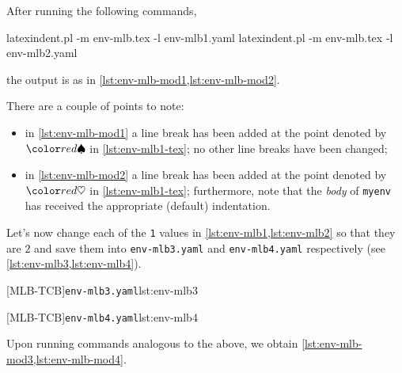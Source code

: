 After running the following commands,
\begin{commandshell}
latexindent.pl -m env-mlb.tex -l env-mlb1.yaml
latexindent.pl -m env-mlb.tex -l env-mlb2.yaml
\end{commandshell}
the output is as in \cref{lst:env-mlb-mod1,lst:env-mlb-mod2}.

\begin{sidebyside}
\begin{minipage}{.57\linewidth}
\end{minipage}
\hfill
\begin{minipage}{.42\linewidth}
\end{minipage}
\end{sidebyside}

There are a couple of points to note:
\begin{itemize}
  \item in \cref{lst:env-mlb-mod1} a line break has been added at the point denoted by $\BeginStartsOnOwnLine$ in \cref{lst:env-mlb1-tex}; no 
    other line breaks have been changed;
  \item in \cref{lst:env-mlb-mod2} a line break has been added at the point denoted by $\BodyStartsOnOwnLine$ in \cref{lst:env-mlb1-tex}; 
    furthermore, note that the \emph{body} of \texttt{myenv} has received the appropriate (default) indentation.
\end{itemize}

Let's now change each of the \texttt{1} values in \cref{lst:env-mlb1,lst:env-mlb2} so that they are $2$ and 
save them into \texttt{env-mlb3.yaml} and \texttt{env-mlb4.yaml} respectively (see \cref{lst:env-mlb3,lst:env-mlb4}).

\begin{minipage}{.45\textwidth}
[MLB-TCB]{\texttt{env-mlb3.yaml}}{lst:env-mlb3}
\end{minipage}
\hfill
\begin{minipage}{.45\textwidth}
[MLB-TCB]{\texttt{env-mlb4.yaml}}{lst:env-mlb4}
\end{minipage}

Upon running  commands analogous to the above, we obtain \cref{lst:env-mlb-mod3,lst:env-mlb-mod4}.

